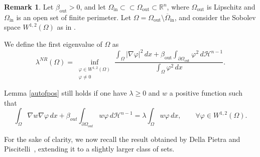 \documentclass[oneside,a4paper,11pt,notitlepage]{article}
\theoremstyle{plain}
\numberwithin{teor}{section}
\numberwithin{equation}{section}
\theoremstyle{definition}
\theoremstyle{plain}
\theoremstyle{plain}
\theoremstyle{plain}
\theoremstyle{plain}
\theoremstyle{definition}
\theoremstyle{definition}
\newtheorem{oss}[oss]{Remark}
\theoremstyle{plain}
\begin{document}
\begin{oss}
\label{tutticasi}
Let $\beta_{\mathrm{out}} > 0$, and let $\Omega_{\mathrm{in}} \subset\subset \Omega_{\mathrm{out}} \subset \mathbb{R}^n$, where $\Omega_{\mathrm{out}}$ is Lipschitz and $\Omega_{\mathrm{in}}$ is an open set of finite perimeter. Let $\Omega = \Omega_{\mathrm{out}} \setminus \overline{\Omega}_{\mathrm{in}}$, and consider the Sobolev space $W^{1,2}(\Omega)$ as in \cite[Chapter~1]{mazya}.

We define the first eigenvalue of $\Omega$ as
\begin{equation}
\label{Nr}
\lambda^{NR}(\Omega)
= \inf_{\substack{\varphi \in W^{1,2}(\Omega) \\ \varphi \ne 0}}
\frac{\displaystyle 
      \int_\Omega |\nabla \varphi|^2\, dx 
      + \beta_{\mathrm{out}} \int_{\partial \Omega_{\mathrm{out}}} \varphi^2\, d\mathcal{H}^{n-1}
     }
     {\displaystyle 
      \int_\Omega \varphi^2\, dx
     }.
\end{equation}


Lemma \ref{autofpos} still holds if one have $\lambda \geq 0$ and $w$ a positive function such that
\begin{equation}
\label{weaknr}
    \int _\Omega \nabla w \nabla \varphi \, dx+\beta_{out} \int_{\partial\Omega_{out}} w \varphi \, d \mathcal{H}^{n-1} = \lambda\int_{\Omega} w \varphi \, dx, \qquad \forall \varphi \in W^{1,2}(\Omega).
    \end{equation}

\end{oss}

For the sake of clarity, we now recall the result obtained by Della Pietra and Piscitelli~\cite[Theorem~1.1]{DPP}, extending it to a slightly larger class of sets.

\end{document}
